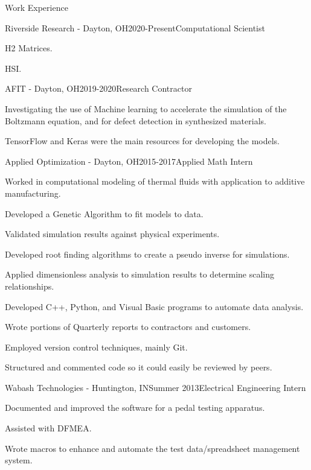 \documentclass{resume} %
\begin{document}
\begin{rSection}{Work Experience}

\begin{rSubsection}{Riverside Research - Dayton, OH}{2020-Present}{Computational Scientist}{}
\item H2 Matrices. 
\item HSI.
\end{rSubsection}

\begin{rSubsection}{AFIT - Dayton, OH}{2019-2020}{Research Contractor}{}
\item Investigating the use of Machine learning to accelerate the simulation of the Boltzmann equation, and for defect detection in synthesized materials. 
\item TensorFlow and Keras were the main resources for developing the models.
\end{rSubsection}

\begin{rSubsection}{Applied Optimization - Dayton, OH}{2015-2017}{Applied Math Intern}{}
\item Worked in computational modeling of thermal fluids with application to additive manufacturing.
\item Developed a Genetic Algorithm to fit models to data.
\item Validated simulation results against physical experiments.
\item Developed root finding algorithms to create a pseudo inverse for simulations.
\item Applied dimensionless analysis to simulation results to determine scaling relationships.
\item Developed C++, Python, and Visual Basic programs to automate data analysis.
\item Wrote portions of Quarterly reports to contractors and customers.
\item Employed version control techniques, mainly Git.
\item Structured and commented code so it could easily be reviewed by peers.
\end{rSubsection}

\begin{rSubsection}{Wabash Technologies - Huntington, IN}{Summer 2013}{Electrical Engineering Intern}{}
\item Documented and improved the software for a pedal testing apparatus.
\item Assisted with DFMEA.
\item Wrote macros to enhance and automate the test data/spreadsheet management system.
\end{rSubsection}


\end{rSection}
\end{document}
